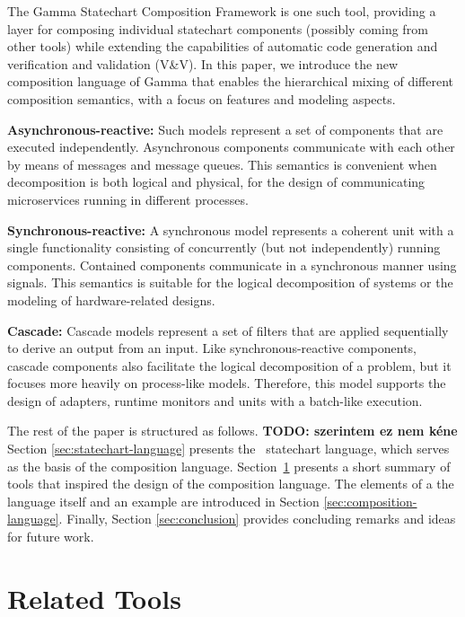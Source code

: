 The Gamma Statechart Composition Framework is one such tool, providing a layer for composing individual statechart components (possibly coming from other tools) while extending the capabilities of automatic code generation and verification and validation (V\&V). In this paper, we introduce the new composition language of Gamma that enables the hierarchical mixing of different composition semantics, with a focus on features and modeling aspects.

\textbf{Asynchronous-reactive:} Such models represent a set of components that are executed independently. Asynchronous components communicate with each other by means of messages and message queues. This semantics is convenient when decomposition is both logical and physical, \eg for the design of communicating microservices running in different processes.
	
\textbf{Synchronous-reactive:} A synchronous model represents a coherent unit with a single functionality consisting of concurrently (but not independently) running components. Contained components communicate in a synchronous manner using signals. This semantics is suitable for the logical decomposition of systems or the modeling of hardware-related designs.
	
\textbf{Cascade:} Cascade models represent a set of filters that are applied sequentially to derive an output from an input. Like synchronous-reactive components, cascade components also facilitate the logical decomposition of a problem, but it focuses more heavily on process-like models. Therefore, this model supports the design of adapters, runtime monitors and units with a batch-like execution.

The rest of the paper is structured as follows. \textbf{TODO: szerintem ez nem k\'ene} Section \ref{sec:statechart-language} presents the \gamma\ statechart language, which serves as the basis of the composition language. Section~\ref{sec:related-tools} presents a short summary of tools that inspired the design of the composition language. The elements of a the language itself and an example are introduced in Section \ref{sec:composition-language}. Finally, Section \ref{sec:conclusion} provides concluding remarks and ideas for future work.

\section{Related Tools}
\label{sec:related-tools}


